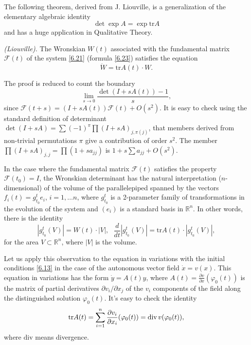 The following theorem, derived from J. Liouville, is a generalization of the elementary algebraic identity
$$
\det \exp A=\exp \textrm{tr}A
$$
and has a huge application in Qualitative Theory.

\begin{theorem}\label{theo:6.23}
	\emph{(Liouville).}
	The Wronskian $W (t)$ associated with the fundamental matrix $\mathcal{F}(t)$ of the system \eqref{6.21} (formula \eqref{6.23}) satisfies the equation
	$$
	\dot{W}=\textrm{tr}A(t)\cdot W.
	$$
\end{theorem}

The proof is reduced to count the boundary
$$
\lim_{s\rightarrow 0}\frac{\det (I+sA(t))-1}{s},
$$
since $\mathcal{F}(t+s) = (I+sA(t)) \mathcal{F}(t) + O(s^{2})$. It is easy to check using the standard definition of determinant $\det \left(I + sA\right) = \sum \left(-1\right)^{\pi} \prod \left(I + sA\right)_{j, \pi(j)}$, that members derived from non-trivial permutations $\pi$ give a contribution of order $s^2$. The member $\prod \left(I + sA\right)_{j, j} = \prod (1+sa_{jj})$ is $1+s\sum a_{jj} + O(s^{2})$.

In the case where the fundamental matrix $\mathcal{F}(t)$ satisfies the property $\mathcal{F}(t_{0})=I$, the Wronskian determinant has the natural interpretation ($n$-dimensional) of the volume of the parallelepiped spanned by the vectors $f_{i}(t)=g_{t_{0}}^{t}e_{i}$, $i=1,\ldots n$, where $g_{t_{0}}^{t}$ is a 2-parameter family of transformations in the evolution of the system and $\left( e_{i}\right) $ is a standard basis in $\mathbb{R}^{n}$. In other words, there is the identity
\begin{equation}
\label{6.28}
\left\vert g_{t_{0}}^{t}(V)\right\vert =W(t)\cdot \left\vert V\right\vert ,%
\text{ \ \ \ }\frac{d}{dt}\left\vert g_{t_{0}}^{t}(V)\right\vert =\textrm{tr}%
A(t)\cdot \left\vert g_{t_{0}}^{t}(V)\right\vert ,
\end{equation}
for the area $V\subset \mathbb{R}^{n}$, where $\left\vert V\right\vert $ is the volume.

Let us apply this observation to the equation in variations with the initial conditions \eqref{6.13} in the case of the autonomous vector field $\dot{x}=v(x)$. This equation in variations has the form $\dot{y}=A(t)y$, where $A(t)=\frac{\partial v}{\partial x}(\varphi _{0}(t))$ is the matrix of partial derivatives $\partial v_{i}/\partial x_{j}$ of the $v_{i}$ components of the field along the distinguished solution $\varphi _{0}(t)$. It's easy to check the identity
\begin{equation}
\label{6.29}
\textrm{tr}A(t)=\sum_{i=1}^{n}\frac{\partial v_{i}}{\partial x_{i}}(\varphi
_{0}(t))=\textrm{div\,}v(\varphi _{0}(t)),
\end{equation}
where $\textrm{div}$ means divergence.

